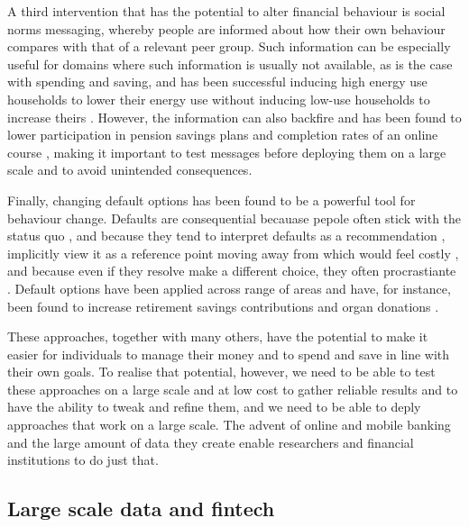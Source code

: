A third intervention that has the potential to alter financial behaviour is
social norms messaging, whereby people are informed about how their own
behaviour compares with that of a relevant peer group. Such information can be
especially useful for domains where such information is usually not available,
as is the case with spending and saving, and has been successful inducing high
energy use households to lower their energy use without inducing low-use
households to increase theirs \citep{schultz2007constructive,
allcott2011social, allcott2014short, brandon2017effects}. However, the
information can also backfire and has been found to lower participation in
pension savings plans \citep{beshears2015effect} and completion rates of an
online course \citep{rogers2016discouraged}, making it important to test
messages before deploying them on a large scale and to avoid unintended
consequences.

Finally, changing default options has been found to be a powerful tool for
behaviour change. Defaults are consequential becauase pepole often stick
with the status quo \citet{samuelson1988status}, and because they tend to
interpret defaults as a recommendation \citep{mckenzie2006recommendations},
implicitly view it as a reference point moving away from which would feel
costly \citet{johnson2003defaults, kahneman1979prospect}, and because even if
they resolve make a different choice, they often procrastiante
\citet{carroll2009optimal, ericson2017interaction}. Default options have been
applied across range of areas and have, for instance, been found to increase
retirement savings contributions \citep{madrian2001power,
beshears2009importance} and organ donations \citep{johnson2003defaults,
gimbel2003presumed, abadie2006impact}.

These approaches, together with many others, have the potential to make it
easier for individuals to manage their money and to spend and save in line with
their own goals. To realise that potential, however, we need to be able to test
these approaches on a large scale and at low cost to gather reliable results
and to have the ability to tweak and refine them, and we need to be able to
deply approaches that work on a large scale. The advent of online and mobile
banking and the large amount of data they create enable researchers and
financial institutions to do just that.


\subsection{Large scale data and fintech}%
\label{sub:large_scale_data_and_fintech}


